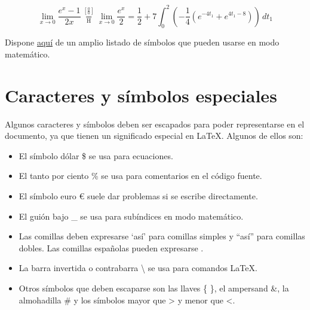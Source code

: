 \begin{equation}\label{eq:ecuacion}
\lim_{x\to 0}{\frac{e^x-1}{2x}}
 \overset{\left[\frac{0}{0}\right]}{\underset{\mathrm{H}}{=}}
 \lim_{x\to 0}{\frac{e^x}{2}}={\frac{1}{2}}
 +7 \int_0^2
  \left(
    -\frac{1}{4}\left(e^{-4t_1}+e^{4t_1-8}\right)
  \right)\,dt_1
\end{equation}

Dispone \href{http://www.yann-ollivier.org/latex/texsymbols.pdf}{aquí} de un amplio listado de símbolos que pueden usarse en modo matemático.

\section{Caracteres y símbolos especiales}
Algunos caracteres y símbolos deben ser escapados para poder representarse en el documento, ya que tienen un significado especial en LaTeX. Algunos de ellos son:

\begin{itemize}
    \item El símbolo dólar \$ se usa para ecuaciones.
    \item El tanto por ciento \% se usa para comentarios en el código fuente.
    \item El símbolo euro \euro{} suele dar problemas si se escribe directamente.
    \item El guión bajo \_ se usa para subíndices en modo matemático.
    \item Las comillas deben expresarse `así' para comillas simples y ``así'' para comillas dobles. Las comillas españolas pueden expresarse .
    \item La barra invertida o contrabarra \textbackslash{} se usa para comandos LaTeX.
    \item Otros símbolos que deben escaparse son las llaves \{ \}, el ampersand \&, la almohadilla \# y los símbolos mayor que \textgreater{} y menor que \textless{}.
\end{itemize}